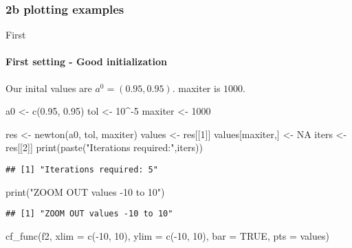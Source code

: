 \documentclass[
]{article}
\newenvironment{Shaded}{\begin{snugshade}}{\end{snugshade}}
\newcommand{\AttributeTok}[1]{\textcolor[rgb]{0.77,0.63,0.00}{#1}}
\newcommand{\ConstantTok}[1]{\textcolor[rgb]{0.00,0.00,0.00}{#1}}
\newcommand{\DecValTok}[1]{\textcolor[rgb]{0.00,0.00,0.81}{#1}}
\newcommand{\FloatTok}[1]{\textcolor[rgb]{0.00,0.00,0.81}{#1}}
\newcommand{\FunctionTok}[1]{\textcolor[rgb]{0.00,0.00,0.00}{#1}}
\newcommand{\NormalTok}[1]{#1}
\newcommand{\OtherTok}[1]{\textcolor[rgb]{0.56,0.35,0.01}{#1}}
\newcommand{\SpecialCharTok}[1]{\textcolor[rgb]{0.00,0.00,0.00}{#1}}
\newcommand{\StringTok}[1]{\textcolor[rgb]{0.31,0.60,0.02}{#1}}
\begin{document}
\hypertarget{b-plotting-examples}{%
\subsubsection{2b plotting examples}\label{b-plotting-examples}}

First

\hypertarget{first-setting---good-initialization-1}{%
\paragraph{First setting - Good
initialization}\label{first-setting---good-initialization-1}}

Our inital values are \(a^{0}=(0.95, 0.95)\). maxiter is \(1000\).

\begin{Shaded}
\begin{Highlighting}[]
\NormalTok{a0 }\OtherTok{\textless{}{-}} \FunctionTok{c}\NormalTok{(}\FloatTok{0.95}\NormalTok{, }\FloatTok{0.95}\NormalTok{)}
\NormalTok{tol }\OtherTok{\textless{}{-}} \DecValTok{10}\SpecialCharTok{\^{}{-}}\DecValTok{5}
\NormalTok{maxiter }\OtherTok{\textless{}{-}} \DecValTok{1000}

\NormalTok{res }\OtherTok{\textless{}{-}} \FunctionTok{newton}\NormalTok{(a0, tol, maxiter)}
\NormalTok{values }\OtherTok{\textless{}{-}}\NormalTok{ res[[}\DecValTok{1}\NormalTok{]]}
\NormalTok{values[maxiter,] }\OtherTok{\textless{}{-}} \ConstantTok{NA}
\NormalTok{iters }\OtherTok{\textless{}{-}}\NormalTok{ res[[}\DecValTok{2}\NormalTok{]]}
\FunctionTok{print}\NormalTok{(}\FunctionTok{paste}\NormalTok{(}\StringTok{"Iterations required:"}\NormalTok{,iters))}
\end{Highlighting}
\end{Shaded}

\begin{verbatim}
## [1] "Iterations required: 5"
\end{verbatim}

\begin{Shaded}
\begin{Highlighting}[]
\FunctionTok{print}\NormalTok{(}\StringTok{"ZOOM OUT values {-}10 to 10"}\NormalTok{)}
\end{Highlighting}
\end{Shaded}

\begin{verbatim}
## [1] "ZOOM OUT values -10 to 10"
\end{verbatim}

\begin{Shaded}
\begin{Highlighting}[]
\FunctionTok{cf\_func}\NormalTok{(f2, }\AttributeTok{xlim =} \FunctionTok{c}\NormalTok{(}\SpecialCharTok{{-}}\DecValTok{10}\NormalTok{, }\DecValTok{10}\NormalTok{), }\AttributeTok{ylim =} \FunctionTok{c}\NormalTok{(}\SpecialCharTok{{-}}\DecValTok{10}\NormalTok{, }\DecValTok{10}\NormalTok{), }\AttributeTok{bar =} \ConstantTok{TRUE}\NormalTok{, }\AttributeTok{pts =}\NormalTok{ values)}
\end{Highlighting}
\end{Shaded}
\end{document}
